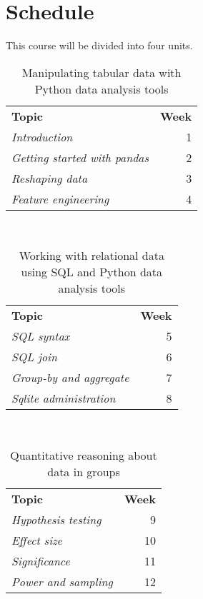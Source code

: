 \documentclass[10pt]{memoir}
\begin{document}
\section{\textbf{Schedule}}

This course will be divided into four units. \\

\begin{table}[htb!]
\centering
\begin{tabular}{lr}
    \textbf{Topic} & \textbf{Week} \\
    \cmidrule[.1em](lr){1-2}
    \textit{Introduction} & 1  \\ %
    \textit{Getting started with pandas} & 2 \\ 
    \textit{Reshaping data} & 3   \\ 
    \textit{Feature engineering} & 4 
 \\
    \cmidrule[.1em](lr){1-2}
\end{tabular}\\
\caption{Manipulating tabular data with Python data analysis tools}
\end{table}


\begin{table}[htb!]
\centering
\begin{tabular}{lr}
    \textbf{Topic} & \textbf{Week} \\
    \cmidrule[.1em](lr){1-2}
    \textit{SQL syntax} & 5  \\ %
    \textit{SQL join} & 6 \\ 
    \textit{Group-by and aggregate} & 7   \\ 
    \textit{Sqlite administration} & 8 
 \\
    \cmidrule[.1em](lr){1-2}
\end{tabular}\\
\caption{Working with relational data using SQL and Python data analysis tools}
\end{table}

\begin{table}[htb!]
\centering
\begin{tabular}{lr}
    \textbf{Topic} & \textbf{Week} \\
    \cmidrule[.1em](lr){1-2}
    \textit{Hypothesis testing} & 9  \\ %
    \textit{Effect size} & 10  \\ 
    \textit{Significance} & 11 \\ 
    \textit{Power and sampling} & 12 
 \\
    \cmidrule[.1em](lr){1-2}
\end{tabular}\\
\caption{Quantitative reasoning about data in groups}
\end{table}
\end{document}
